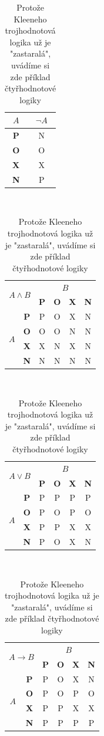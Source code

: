 \documentclass[a4paper, 11pt]{article}
\begin{document}
    \begin{table}[h]
    \begin{tabular}{|c|c|}
    \hline
    $A$ & $\neg A$ \\ \hline
    \textbf{P} & N \\ \hline
    \textbf{O} & O \\ \hline
    \textbf{X} & X \\ \hline
    \textbf{N} & P \\ \hline
    \end{tabular}
    \ 
    \begin{tabular}{|c|c|c|c|c|c|}
    \hline
    \multicolumn{2}{|c|}{\multirow{2}{*}{$A \land B$}} & \multicolumn{4}{c|}{$B$} \\ \cline{3-6} 
    \multicolumn{2}{|c|}{} & \textbf{P} & \textbf{O} & \textbf{X} & \textbf{N} \\ \hline
    \multirow{4}{*}{$A$} & \textbf{P} & P & O & X & N \\ \cline{2-6} 
     & \textbf{O} & O & O & N & N \\ \cline{2-6} 
     & \textbf{X} & X & N & X & N \\ \cline{2-6} 
     & \textbf{N} & N & N & N & N \\ \hline
    \end{tabular}
    \ 
    \begin{tabular}{|c|c|c|c|c|c|}
    \hline
    \multicolumn{2}{|c|}{\multirow{2}{*}{$A \lor B$}} & \multicolumn{4}{c|}{$B$} \\ \cline{3-6} 
    \multicolumn{2}{|c|}{} & \textbf{P} & \textbf{O} & \textbf{X} & \textbf{N} \\ \hline
    \multirow{4}{*}{$A$} & \textbf{P} & P & P & P & P \\ \cline{2-6} 
     & \textbf{O} & P & O & P & O \\ \cline{2-6} 
     & \textbf{X} & P & P & X & X \\ \cline{2-6} 
     & \textbf{N} & P & O & X & N \\ \hline
    \end{tabular}
    \ 
    \begin{tabular}{|c|c|c|c|c|c|}
    \hline
    \multicolumn{2}{|c|}{\multirow{2}{*}{$A \rightarrow B$}} & \multicolumn{4}{c|}{$B$} \\ \cline{3-6} 
    \multicolumn{2}{|c|}{} & \textbf{P} & \textbf{O} & \textbf{X} & \textbf{N} \\ \hline
    \multirow{4}{*}{$A$} & \textbf{P} & P & O & X & N \\ \cline{2-6} 
     & \textbf{O} & P & O & P & O \\ \cline{2-6} 
     & \textbf{X} & P & P & X & X \\ \cline{2-6} 
     & \textbf{N} & P & P & P & P \\ \hline
    \end{tabular}
    \caption{Protože Kleeneho trojhodnotová logika už je "zastaralá", uvádíme si zde příklad čtyřhodnotové logiky}
    \label{tabulka-2}
    \end{table}
    \shorthandon{-}
\end{document}
